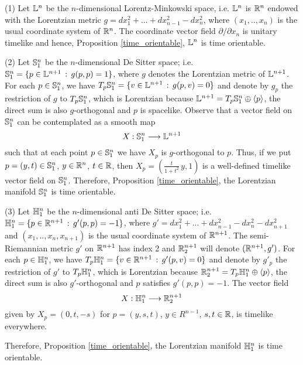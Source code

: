 \begin{example}
    (1) Let $\L^n$ be the $n$-dimensional Lorentz-Minkowski space, i.e. $\L^n$ is $\R^n$ endowed with the Lorentzian metric $g=dx_1^2+...+dx_{n-1}^2-dx_n^2$, where $(x_1,..,x_n)$ is the usual coordinate system of $\R^n$. The coordinate vector field $\partial/\partial x_n$ is unitary timelike and hence, Proposition \ref{time_orientable}, $\L ^n$ is time orientable.

    \vspace{2mm}

    \noindent (2) Let $\S_1^n$ be the $n$-dimensional De Sitter space; i.e. $\S_1^n =\{p \in \L^{n+1} \, :\, g(p,p)=1 \}$, where $g$ denotes the Lorentzian metric of $\L^{n+1}$. For each $p \in \S_1^n$, we have $T_p\S_1^n=\{v \in \L^{n+1} \, : \, g(p,v)=0\}$
    and denote by $g_p$ the restriction of $g$ to $T_p\S_1^n$, which is Lorentzian because $\L^{n+1}=T_p\S_1^n \oplus \langle p \rangle$, the direct sum is also $g$-orthogonal and $p$ is spacelike. Observe that a vector field on $\S_1^n$ can be contemplated as a smooth map
    \[
        X : \S_1^n \longrightarrow \L^{n+1}
    \]
    such that at each point $p \in \S_1^n$ we have $X_p$ is $g$-orthogonal to $p$. Thus, if we put $p=(y,t)\in \S_1^n$, $y \in \R^n$, $t \in \R$, then $X_p=(\frac{t}{1+t^2}\,y,1)$ is a well-defined timelike vector field on $\S_1^n$. Therefore, Proposition \ref{time_orientable}, the Lorentzian manifold $\S_1^n$ is time orientable.

    \vspace{2mm}

    \noindent (3) Let $\H_1^n$ be the $n$-dimensional anti De Sitter space; i.e. $\H_1^n =\{p \in \R^{n+1} \, :\, g'(p,p)=-1 \}$, where $g'=dx_1^2+...+dx_{n-1}^2-dx_n^2-dx_{n+1}^2$ and $(x_1,..,x_n,x_{n+1})$ is the usual coordinate system of $\R^{n+1}$. The semi-Riemannian metric $g'$ on $\R^{n+1}$ has index 2 and
    $\R^{n+1}_2$ will denote $(\R^{n+1},g')$. For each $p \in \H_1^n$, we have $T_p\H_1^n=\{v \in \R^{n+1} \, : \, g'(p,v)=0\}$ and denote by $g'_p$ the restriction of $g'$ to $T_p\H_1^n$, which is Lorentzian because $\R^{n+1}_2=T_p\H_1^n \oplus \langle p \rangle$,
    the direct sum is also $g'$-orthogonal and $p$ satisfies $g'(p,p)=-1$. The vector field
    \[
        X : \H_1^n \longrightarrow \R^{n+1}_2
    \]
    given by $X_p=(0,t,-s)$ for $p=(y,s,t)$, $y \in R^{n-1}$, $s,t\in \R$, is timelike everywhere.

    Therefore, Proposition \ref{time_orientable}, the Lorentzian manifold $\H_1^n$ is time orientable.
\end{example}


